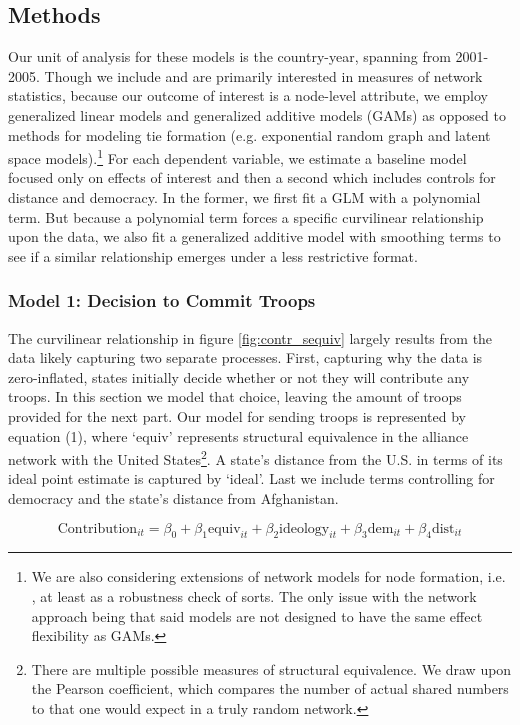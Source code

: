 \documentclass[12pt,letterpaper]{article}
\begin{document}
	\subsection{Methods}
		Our unit of analysis for these models is the country-year, spanning from 2001-2005. Though we include and are primarily interested in measures of network statistics, because our outcome of interest is a node-level attribute, we employ generalized linear models and generalized additive models (GAMs) as opposed to methods for modeling tie formation (e.g. exponential random graph and latent space models).\footnote{We are also considering extensions of network models for node formation, i.e. \citet{fosdick_testingmodelingdependencies_2015}, at least as a robustness check of sorts. The only issue with the network approach being that said models are not designed to have the same effect flexibility as GAMs.} For each dependent variable, we estimate a baseline model focused only on effects of interest and then a second which includes controls for distance and democracy. In the former, we first fit a GLM with a polynomial term. But because a polynomial term forces a specific curvilinear relationship upon the data, we also fit a generalized additive model with smoothing terms to see if a similar relationship emerges under a less restrictive format.

		\subsubsection{Model 1: Decision to Commit Troops}
			The curvilinear relationship in figure \ref{fig:contr_sequiv} largely results from the data likely capturing two separate processes. First, capturing why the data is zero-inflated, states initially decide whether or not they will contribute any troops. In this section we model that choice, leaving the amount of troops provided for the next part. Our model for sending troops is represented by equation (1), where `equiv' represents structural equivalence in the alliance network with the United States\footnote{There are multiple possible measures of structural equivalence. We draw upon the Pearson coefficient, which compares the number of actual shared numbers to that one would expect in a truly random network.}. A state's distance from the U.S. in terms of its ideal point estimate is captured by `ideal'. \citep{bailey_twodimensionalanalysisseventy_2018} Last we include terms controlling for democracy and the state's distance from Afghanistan.

			\vspace{-2em}
			\begin{equation}
			\text{Contribution}_{it} = \beta_0 + \beta_1\text{equiv}_{it} +  \beta_2\text{ideology}_{it} + \beta_3\text{dem}_{it} + \beta_4\text{dist}_{it}
			\end{equation}
	
\end{document}
